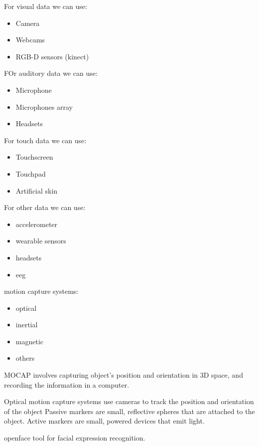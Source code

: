 \documentclass[11pt,a4paper]{article}
\theoremstyle{definition}
\theoremstyle{plain}
\theoremstyle{remark}
\begin{document}
For visual data we can use:
\begin{itemize}
    \item Camera
    \item Webcams
    \item RGB-D sensors (kinect)
\end{itemize}

FOr auditory data we can use:
\begin{itemize}
    \item Microphone
    \item Microphones array
    \item Headsets
\end{itemize}

For touch data we can use:
\begin{itemize}
    \item Touchscreen
    \item Touchpad
    \item Artificial skin
\end{itemize}   

For other data we can use:
\begin{itemize}
    \item accelerometer
    \item wearable sensors
    \item headsets
    \item eeg
\end{itemize}
motion capture systems:
\begin{itemize}
    \item optical
    \item inertial
    \item magnetic
    \item others
\end{itemize}

MOCAP involves capturing object's position and orientation in 3D space, and recording
the information in a computer.

Optical motion capture systems use cameras to track the position and orientation of the object
Passive markers are small, reflective spheres that are attached to the object.
Active markers are small, powered devices that emit light.

openface tool for facial expression recognition.
\end{document}
